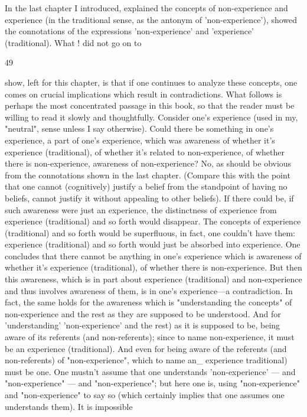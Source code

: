 \documentclass[10pt,twoside]{memoir}
\begin{document}
\begin{enumerate}
{{{{{{{{{{{{In the last chapter I introduced, explained the concepts of 
non-experience and experience (in the traditional sense, as the antonym of 
'non-experience'), showed the connotations of the expressions 
'non-experience' and 'experience' (traditional). What ! did not go on to 


49 


show, left for this chapter, is that if one continues to analyze these concepts, 
one comes on crucial implications which result in contradictions. What 
follows is perhaps the most concentrated passage in this book, so that the 
reader must be willing to read it slowly and thoughtfully. Consider one's 
experience (used in my, "neutral", sense unless I say otherwise). Could there 
be something in one's experience, a part of one's experience, which was 
awareness of whether it's experience (traditional), of whether it's related to 
non-experience, of whether there is non-experience, awareness of 
non-experience? No, as should be obvious from the connotations shown in 
the last chapter. (Compare this with the point that one cannot (cognitively) 
justify a belief from the standpoint of having no beliefs, cannot justify it 
without appealing to other beliefs). If there could be, if such awareness were 
just an experience, the distinctness of experience from experience 
(traditional) and so forth would disappear. The concepts of experience 
(traditional) and so forth would be superfluous, in fact, one couldn't have 
them: experience (traditional) and so forth would just be absorbed into 
experience. One concludes that there cannot be anything in one's experience 
which is awareness of whether it's experience (traditional), of whether there 
is non-experience. But then this awareness, which is in part about experience 
(traditional) and non-experience and thus involves awareness of them, is in 
one's experience---a contradiction. In fact, the same holds for the awareness 
which is "understanding the concepts" of non-experience and the rest as 
they are supposed to be understood. And for 'understanding' 
'non-experience' {and the rest) as it is supposed to be, being aware of its 
referents (and non-referents); since to name non-experience, it must be an 
experience (traditional). And even for being aware of the referents (and 
non-referents) of "non-experience", which to name an_ experience 
{traditional) must be one. One mustn't assume that one understands 
'non-experience' --- and "non-experience" --- and "non-experience"; but here 
one is, using "non-experience" and "non-experience" to say so (which 
certainly implies that one assumes one understands them). It is impossible 
}}}}}}}}}}}}}}
\end{enumerate}
\end{document}
